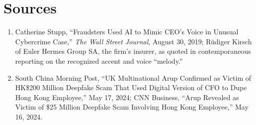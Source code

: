 \section*{Sources}
\begin{enumerate}[label=\lbrack\arabic*\rbrack, leftmargin=2.2em]
\item {}Catherine Stupp, ``Fraudsters Used AI to Mimic CEO's Voice in Unusual
Cybercrime Case,'' \emph{The Wall Street Journal}, August 30, 2019; Rüdiger Kirsch of Euler Hermes
Group SA, the firm's insurer, as quoted in contemporaneous reporting on the recognized accent and
voice ``melody.''
\item {}South China Morning Post, ``UK Multinational Arup Confirmed as Victim of
HK\$200 Million Deepfake Scam That Used Digital Version of CFO to Dupe Hong Kong Employee,'' May
17, 2024; CNN Business, ``Arup Revealed as Victim of \$25 Million Deepfake Scam Involving Hong
Kong Employee,'' May 16, 2024.
\end{enumerate}
